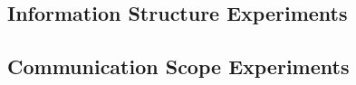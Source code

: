 \subsection{Information Structure Experiments}
%
%
%

\subsection{Communication Scope Experiments}
%
%
%

